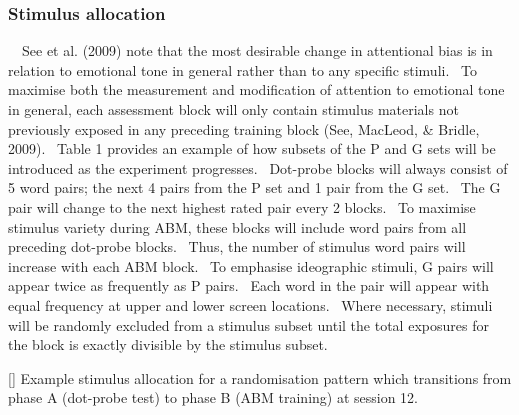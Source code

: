 \documentclass[man,a4paper]{apa6}
\begin{document}
\subsubsection[Stimulus allocation]{Stimulus allocation}
\ \ See et al. (2009) note that the most desirable change in attentional bias is in relation to emotional tone in general rather than to any specific stimuli. \ To maximise both the measurement and modification of attention to emotional tone in general, each assessment block will only contain stimulus materials not previously exposed in any preceding training block (See, MacLeod, \& Bridle, 2009). \ Table 1 provides an example of how subsets of the P and G sets will be introduced as the experiment progresses. \ Dot-probe blocks will always consist of 5 word pairs; the next 4 pairs from the P set and 1 pair from the G set. \ The G pair will change to the next highest rated pair every 2 blocks. \ To maximise stimulus variety during ABM, these blocks will include word pairs from all preceding dot-probe blocks. \ Thus, the number of stimulus word pairs will increase with each ABM block. \ To emphasise ideographic stimuli, G pairs will appear twice as frequently as P pairs. \ Each word in the pair will appear with equal frequency at upper and lower screen locations. \ Where necessary, stimuli will be randomly excluded from a stimulus subset until the total exposures for the block is exactly divisible by the stimulus subset.

[]{}
Example stimulus allocation for a randomisation pattern which transitions from phase A (dot-probe test) to phase B (ABM training) at session 12.
\end{document}
